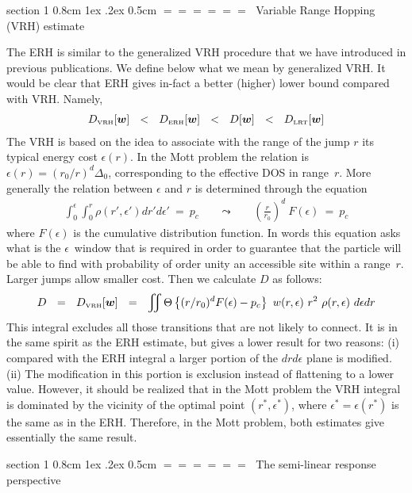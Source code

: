 \documentclass[onecolumn,fleqn,notitlepage,secnumarabic]{revtex4}
\makeatletter
\newcommand{\tbox}[1]{\mbox{\tiny #1}}
\newcommand{\beq}{\begin{eqnarray}}
\newcommand{\eeq}{\end{eqnarray}}
\def\section{%
  \@startsection
    {section}%
    {1}%
    {\z@}%
    {0.8cm \@plus1ex \@minus .2ex}%
    {0.5cm}%
    {\Large\bf $=\!=\!=\!=\!=\!=\;$}%
}%
\makeatother
\begin{document}
\section{Variable Range Hopping (VRH) estimate}

The ERH is similar to the generalized VRH procedure 
that we have introduced in previous publications.
We define below what we mean by generalized VRH. 
It would be clear that ERH gives in-fact a better (higher) 
lower bound compared with VRH. Namely, 
%
\beq
D_{\tbox{VRH}}[\bm{w}]  
\ \ < \ \ D_{\tbox{ERH}}[\bm{w}]
\ \ < \ \ D[\bm{w}]
\ \ < \ \ D_{\tbox{LRT}}[\bm{w}]
\eeq
%
The VRH is based on the idea to associate
with the range of the jump $r$ its typical 
energy cost $\epsilon(r)$. In the Mott problem 
the relation is $\epsilon(r) = (r_0/r)^d \Delta_0$, 
corresponding to the effective DOS in range~$r$. 
More generally the relation between $\epsilon$ and $r$ 
is determined through the equation 
%
\beq
\int_0^{\epsilon} \int_0^{r} \rho(r',\epsilon')  dr'd\epsilon' \  = \  p_c 
\ \ \ \ \ \ \ \ \leadsto \ \ \ \ \ \ \ \ 
\left(\frac{r}{r_0}\right)^d \ F(\epsilon) \ = \ p_c
\eeq
%
where $F(\epsilon)$ is the cumulative distribution function.
In words this equation asks what is the $\epsilon$~window that 
is required in order to guarantee that the particle will be able 
to find with probability of order unity an accessible site within 
a range~$r$. Larger jumps allow smaller cost. 
Then we calculate $D$ as follows: 
%
\beq
D \ \ = \ \ D_{\tbox{VRH}}[\bm{w}]  \ \ = \ \ 
\iint \Theta\left\{ (r/r_0)^d F(\epsilon) - p_c \right\} \ w(r,\epsilon) \ r^2  \ \rho(r,\epsilon) \ d\epsilon dr
\eeq
%
This integral excludes all those transitions that are not likely to connect. 
It is in the same spirit as the ERH estimate, but gives a lower result 
for two reasons: (i) compared with the ERH integral a larger portion of 
the $drd\epsilon$ plane is modified. (ii) The modification in this portion 
is exclusion instead of flattening to a lower value.
However, it should be realized that in the Mott problem the VRH 
integral is dominated by the vicinity of the optimal point ${(r^*,\epsilon^*)}$, 
where $\epsilon^*=\epsilon(r^*)$ is the same as in the ERH. 
Therefore, in the Mott problem, both estimates give essentially the same result.


\section{The semi-linear response perspective}
\end{document}
